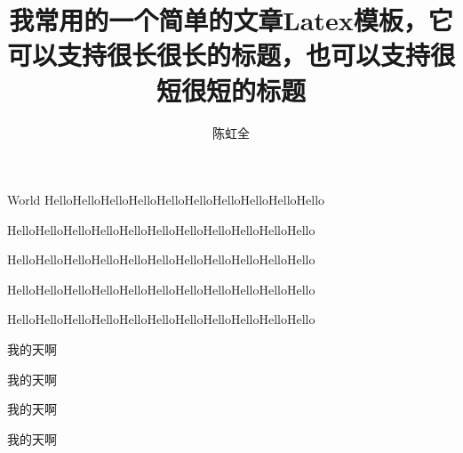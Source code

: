 \documentclass{myarticle}
\title{我常用的一个简单的文章Latex模板，它可以支持很长很长的标题，也可以支持很短很短的标题}
\author{陈虹全}
\begin{document}
\maketitle
\begin{section}{World}
HelloHelloHelloHelloHelloHelloHelloHelloHelloHello

HelloHelloHelloHelloHelloHelloHelloHelloHelloHelloHello

HelloHelloHelloHelloHelloHelloHelloHelloHelloHelloHello

HelloHelloHelloHelloHelloHelloHelloHelloHelloHelloHello

HelloHelloHelloHelloHelloHelloHelloHelloHelloHelloHello

\songti 我的天啊

\kaiti 我的天啊

\heiti 我的天啊

\fangsong 我的天啊

\end{section}
\end{document}
